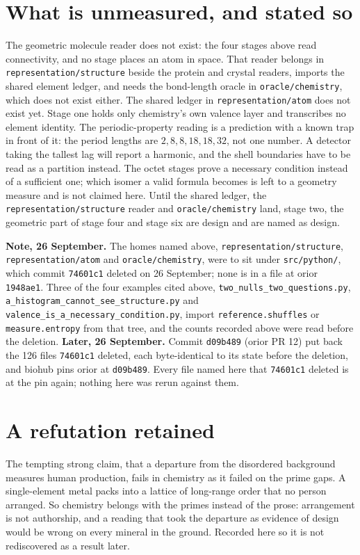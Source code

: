 \section*{What is unmeasured, and stated so}

The geometric molecule reader does not exist: the four stages above read connectivity, and no stage
places an atom in space. That reader belongs in \texttt{representation/structure} beside the protein
and crystal readers, imports the shared element ledger, and needs the bond-length oracle in
\texttt{oracle/chemistry}, which does not exist either. The shared ledger in
\texttt{representation/atom} does not exist yet. Stage one holds only chemistry's own valence layer
and transcribes no element identity. The periodic-property reading is a prediction with a known trap
in front of it: the period lengths are \(2, 8, 8, 18, 18, 32\), not one number. A detector taking the
tallest lag will report a harmonic, and the shell boundaries have to be read as a partition instead.
The octet stages prove a necessary condition instead of a sufficient one; which isomer a valid formula
becomes is left to a geometry measure and is not claimed here. Until the shared ledger, the
\texttt{representation/structure} reader and \texttt{oracle/chemistry} land, stage two, the geometric
part of stage four and stage six are design and are named as design.

\textbf{Note, 26 September.} The homes named above, \texttt{representation/structure},
\texttt{representation/atom} and \texttt{oracle/chemistry}, were to sit under
\texttt{src/python/}, which commit \texttt{74601c1} deleted on 26 September; none is in a file
at orior \texttt{1948ae1}. Three of the four examples cited above,
\texttt{two\_nulls\_two\_questions.py}, \texttt{a\_histogram\_cannot\_see\_structure.py} and
\texttt{valence\_is\_a\_necessary\_condition.py}, import \texttt{reference.shuffles} or
\texttt{measure.entropy} from that tree, and the counts recorded above were read before the deletion.
\textbf{Later, 26 September.} Commit \texttt{d09b489} (orior PR 12) put back the 126 files
\texttt{74601c1} deleted, each byte-identical to its state before the deletion, and biohub pins
orior at \texttt{d09b489}. Every file named here that \texttt{74601c1} deleted is at the pin
again; nothing here was rerun against them.

\section*{A refutation retained}

The tempting strong claim, that a departure from the disordered background measures human production,
fails in chemistry as it failed on the prime gaps. A single-element metal packs into a lattice of
long-range order that no person arranged. So chemistry belongs with the primes instead of the prose:
arrangement is not authorship, and a reading that took the departure as evidence of design would be
wrong on every mineral in the ground. Recorded here so it is not rediscovered as a result later.
